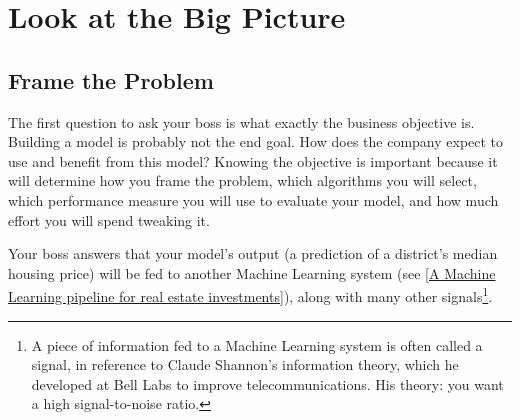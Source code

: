 \section{Look at the Big Picture}
\subsection{Frame the Problem}
The first question to ask your boss is what exactly the business objective is. Building a
model is probably not the end goal. How does the company expect to use and benefit
from this model? Knowing the objective is important because it will determine how
you frame the problem, which algorithms you will select, which performance measure you will use to evaluate your model, and how much effort you will spend tweaking it.

Your boss answers that your model's output (a prediction of a district’s median housing price) will be fed to another Machine Learning system (see \autoref{A Machine Learning pipeline for real estate investments}), along
with many other signals\footnote{A piece of information fed to a Machine Learning system is often called a signal, in reference to Claude Shannon’s information theory, which he developed at Bell Labs to improve telecommunications. His theory: you
want a high signal-to-noise ratio.}.

